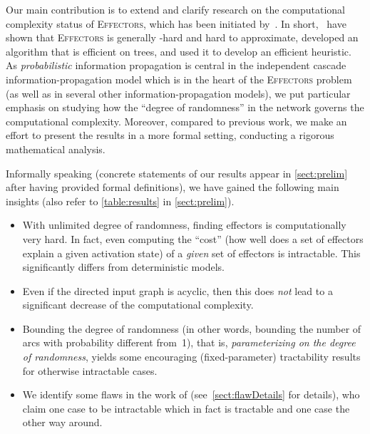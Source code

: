 \documentclass{article}
\newcommand{\probEffectors}{\textsc{Effectors}\xspace}
\begin{document}
Our main contribution is to extend and clarify research 
on the computational complexity status of \probEffectors, which has 
been initiated by~\citet{LTGMH10}.
In short,~\citet{LTGMH10} have shown that \probEffectors is generally -hard and hard to approximate,
developed an algorithm that is efficient on trees,
and used it to develop an efficient heuristic.
As \emph{probabilistic} information propagation is central in the independent cascade information-propagation model
which is in the heart of the \probEffectors problem (as well as in several other information-propagation models),
we put particular emphasis on studying how the ``degree of randomness''
in the network governs the computational complexity.
Moreover, compared to previous work, we make an effort to present
the results in a more formal setting, conducting a rigorous mathematical analysis.


Informally speaking (concrete statements of our results appear 
in \autoref{sect:prelim} after having provided formal definitions), 
we have gained the following main insights (also refer to \autoref{table:results} in
\autoref{sect:prelim}).
\begin{itemize}
  \item With unlimited degree of randomness, finding effectors is 
  computationally very hard. In fact, even computing the ``cost'' (how well 
  does a set of effectors explain a given activation state) of a \emph{given}
  set of effectors is intractable.
  This significantly differs from
  deterministic models.
  \item Even if the directed input graph is acyclic, then this does \emph{not}
  lead to a significant decrease of the computational complexity. 
  \item Bounding the degree of randomness (in other words, bounding the number 
  of arcs with probability different from~1), that is,
  \emph{parameterizing on the degree of randomness}, yields some 
  encouraging (fixed-parameter) tractability 
  results for otherwise intractable cases.
  \item We identify some flaws in the work of \citet{LTGMH10}
  (see~\autoref{sect:flawDetails} for details),
  who claim one case to be intractable which in fact is tractable and one case the other
  way around.
\end{itemize}
\end{document}
